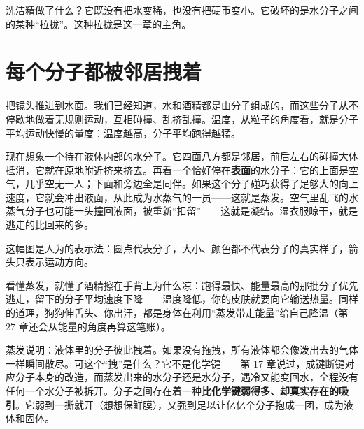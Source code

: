 洗洁精做了什么？它既没有把水变稀，也没有把硬币变小。它破坏的是水分子之间的某种“拉拢”。这种拉拢是这一章的主角。

\section{每个分子都被邻居拽着}

把镜头推进到水面。我们已经知道，水和酒精都是由分子组成的，而这些分子从不停歇地做着无规则运动，互相碰撞、乱挤乱撞。温度，从粒子的角度看，就是分子平均运动快慢的量度：温度越高，分子平均跑得越猛。

现在想象一个待在液体内部的水分子。它四面八方都是邻居，前后左右的碰撞大体抵消，它就在原地附近挤来挤去。再看一个恰好停在\textbf{表面}的水分子：它的上面是空气，几乎空无一人；下面和旁边全是同伴。如果这个分子碰巧获得了足够大的向上速度，它就会冲出液面，从此成为水蒸气的一员——这就是蒸发。空气里乱飞的水蒸气分子也可能一头撞回液面，被重新“扣留”——这就是凝结。湿衣服晾干，就是逃走的比回来的多。

\begin{center}
\end{center}

这幅图是人为的表示法：圆点代表分子，大小、颜色都不代表分子的真实样子，箭头只表示运动方向。

看懂蒸发，就懂了酒精擦在手背上为什么凉：跑得最快、能量最高的那批分子优先逃走，留下的分子平均速度下降——温度降低，你的皮肤就要向它输送热量。同样的道理，狗狗伸舌头、你出汗，都是身体在利用“蒸发带走能量”给自己降温（第 27 章还会从能量的角度再算这笔账）。

蒸发说明：液体里的分子彼此拽着。如果没有拖拽，所有液体都会像泼出去的气体一样瞬间散尽。可这个“拽”是什么？它不是化学键——第 17 章说过，成键断键对应分子本身的改造，而蒸发出来的水分子还是水分子，遇冷又能变回水，全程没有任何一个水分子被拆开。分子之间存在着一种\textbf{比化学键弱得多、却真实存在的吸引}。它弱到一撕就开（想想保鲜膜），又强到足以让亿亿个分子抱成一团，成为液体和固体。

